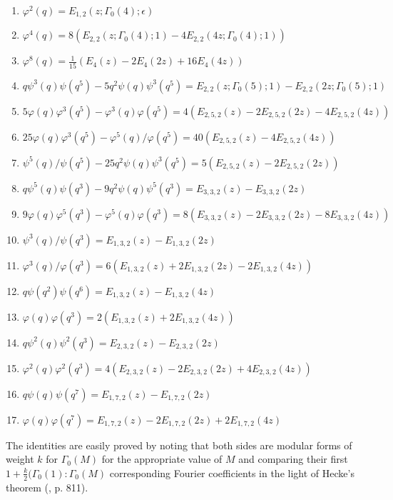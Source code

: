 \begin{enumerate}
\renewcommand{\labelenumi}{(\theenumi)}
\item $\varphi^{2}(q)=E_{1,2}(z;\Gamma_{0}(4);\epsilon)$

\item $\varphi^{4}(q)=8(E_{2,2}(z;\Gamma_{0}(4);1)-4E_{2,2}(4z;\Gamma_{0}(4);1))$

\item $\varphi^{8}(q)=\frac{1}{15}(E_{4}(z)-2E_{4}(2z)+16E_{4}(4z))$

\item $q\psi^{3}(q)\psi(q^{5})-5q^{2}\psi(q)\psi^{3}(q^{5})=E_{2,2}(z;\Gamma_{0}(5);1)-E_{2,2}(2z;\Gamma_{0}(5);1)$

\item $5\varphi(q)\varphi^{3}(q^{5})-\varphi^{3}(q)\varphi(q^{5})=4(E_{2,5,2}(z)-2E_{2,5,2}(2z)-4E_{2,5,2}(4z))$

\item $25\varphi(q)\varphi^{3}(q^{5})-\varphi^{5}(q)/\varphi(q^{5})=40(E_{2,5,2}(z)-4E_{2,5,2}(4z))$

\item $\psi^{5}(q)/\psi(q^{5})-25q^{2}\psi(q)\psi^{3}(q^{5})=5(E_{2,5,2}(z)-2E_{2,5,2}(2z))$

\item $q\psi^{5}(q)\psi(q^{3})-9q^{2}\psi(q)\psi^{5}(q^{3})=E_{3,3,2}(z)-E_{3,3,2}(2z)$

\item $9\varphi(q)\varphi^{5}(q^{3})-\varphi^{5}(q)\varphi(q^{3})=8(E_{3,3,2}(z)-2E_{3,3,2}(2z)-8E_{3,3,2}(4z))$

\item $\psi^{3}(q)/\psi(q^{3})=E_{1,3,2}(z)-E_{1,3,2}(2z)$

\item $\varphi^{3}(q)/\varphi(q^{3})=6(E_{1,3,2}(z)+2E_{1,3,2}(2z)-2E_{1,3,2}(4z))$

\item $q\psi(q^{2})\psi(q^{6})=E_{1,3,2}(z)-E_{1,3,2}(4z)$

\item $\varphi(q)\varphi(q^{3})=2(E_{1,3,2}(z)+2E_{1,3,2}(4z))$

\item $q\psi^{2}(q)\psi^{2}(q^{3})=E_{2,3,2}(z)-E_{2,3,2}(2z)$

\item $\varphi^{2}(q)\varphi^{2}(q^{3})=4(E_{2,3,2}(z)-2E_{2,3,2}(2z)+4E_{2,3,2}(4z))$

\item $q\psi(q)\psi(q^{7})=E_{1,7,2}(z)-E_{1,7,2}(2z)$

\item $\varphi(q)\varphi(q^{7})=E_{1,7,2}(z)-2E_{1,7,2}(2z)+2E_{1,7,2}(4z)$
\end{enumerate}
The identities are easily proved by noting that both sides are modular forms of weight $k$ for $\Gamma_{0}(M)$ for the appropriate value of $M$ and comparing their first $1+\frac{k}{2}(\Gamma_{0}(1):\Gamma_{0}(M)$ corresponding Fourier coefficients in the light of Hecke's theorem (\cite{art8-key5}, p. 811).

